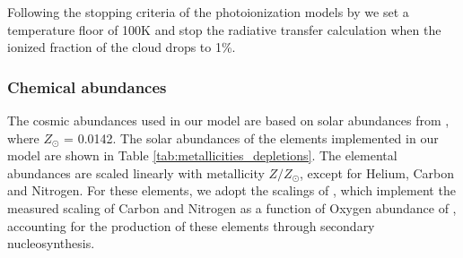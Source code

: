 \documentclass[fleqn,usenatbib]{mnras}
\begin{document}
Following the stopping criteria of the photoionization models by \cite{byler2017} we set a temperature floor of 100K and stop the radiative transfer calculation when the ionized fraction of the cloud drops to 1\%.

\subsubsection{Chemical abundances}
The cosmic abundances used in our model are based on solar abundances from \cite{grevesse2010}, where $Z_{\odot}$ = 0.0142. The solar abundances of the elements implemented in our model are shown in Table \ref{tab:metallicities_depletions}. The elemental abundances are scaled linearly with metallicity $Z/Z_{\odot}$, except for Helium, Carbon and Nitrogen. For these elements, we adopt the scalings of \cite{dopita2013}, which implement the measured scaling of Carbon and Nitrogen as a function of Oxygen abundance of \cite{vanzee1998}, accounting for the production of these elements through secondary nucleosynthesis.
\end{document}
